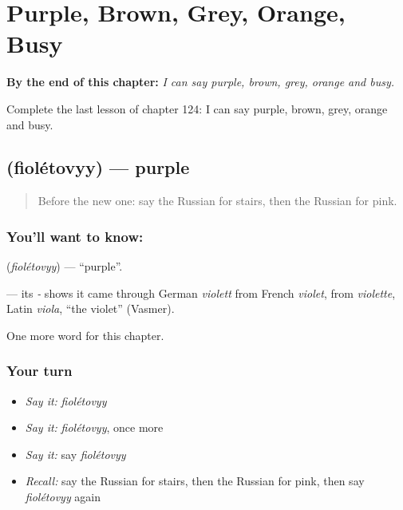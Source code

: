 
\chapter{Purple, Brown, Grey, Orange, Busy}
\label{ch:ru-purple-brown-grey-orange-busy}

\begin{chapteropening}
\textbf{By the end of this chapter:} \emph{I can say purple, brown, grey, orange and busy.}

Complete the last lesson of chapter 124: I can say purple, brown, grey, orange and busy.
\end{chapteropening}

\section[\texorpdfstring{\ru{фиолетовый} (fiolétovyy)}{фиолетовый (fiolétovyy)}]{ (fiolétovyy) — purple}

\label{lesson:RU-C124-purple}



\begin{quote}
Before the new one: say the Russian for stairs, then the Russian for pink.
\end{quote}

\subsection*{You'll want to know: }
\textbf{} (\emph{fiolétovyy}) — \textquotedblleft{}purple\textquotedblright{}.

\begin{cousinweb}
\textbf{} — its \emph{-} shows it came through German \emph{violett} from French \emph{violet}, from \emph{violette}, Latin \emph{viola}, \textquotedblleft{}the violet\textquotedblright{} (Vasmer).
\end{cousinweb}

\begin{grammarlens}[title={What you've built}]
One more word for this chapter.
\end{grammarlens}

\subsection*{Your turn}
\begin{itemize}
\raggedright
  \item \emph{Say it:} \emph{fiolétovyy}
  \item \emph{Say it:} \emph{fiolétovyy}, once more
  \item \emph{Say it:} say \emph{fiolétovyy}
  \item \emph{Recall:} say the Russian for stairs, then the Russian for pink, then say \emph{fiolétovyy} again
\end{itemize}

